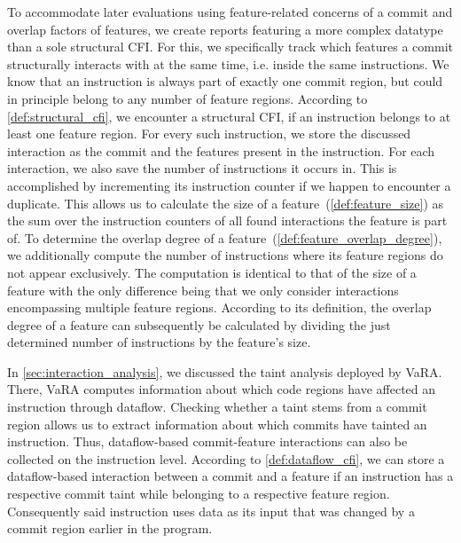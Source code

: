 To accommodate later evaluations using feature-related concerns of a commit and overlap factors of features, we create reports featuring a more complex datatype than a sole structural CFI.
For this, we specifically track which features a commit structurally interacts with at the same time, i.e. inside the same instructions.
We know that an instruction is always part of exactly one commit region, but could in principle belong to any number of feature regions.
According to \autoref{def:structural_cfi}, we encounter a structural CFI, if an instruction belongs to at least one feature region.
For every such instruction, we store the discussed interaction as the commit and the features present in the instruction.
For each interaction, we also save the number of instructions it occurs in. 
This is accomplished by incrementing its instruction counter if we happen to encounter a duplicate. 
This allows us to calculate the size of a feature~(\autoref{def:feature_size}) as the sum over the instruction counters of all found interactions the feature is part of.
To determine the overlap degree of a feature~(\autoref{def:feature_overlap_degree}), we additionally compute the number of instructions where its feature regions do not appear exclusively.
The computation is identical to that of the size of a feature with the only difference being that we only consider interactions encompassing multiple feature regions.
According to its definition, the overlap degree of a feature can subsequently be calculated by dividing the just determined number of instructions by the feature's size.

In \autoref{sec:interaction_analysis}, we discussed the taint analysis deployed by VaRA.
There, VaRA computes information about which code regions have affected an instruction through dataflow.
Checking whether a taint stems from a commit region allows us to extract information about which commits have tainted an instruction.
Thus, dataflow-based commit-feature interactions can also be collected on the instruction level.
According to \autoref{def:dataflow_cfi}, we can store a dataflow-based interaction between a commit and a feature if an instruction has a respective commit taint while belonging to a respective feature region.
Consequently said instruction uses data as its input that was changed by a commit region earlier in the program. 

\iffalse
For our research we examine numerous software projects to get a wide range of reference data, as commit-feature interactions could potentially vary greatly between different code spaces.
Accordingly, the VaRA-Tool-Suite was extended making it possible to generate a report comprising all found CFIs of an according type in a software project.
This aids us in examining several software projects to gain sufficient and sensible data about commit-feature interactions.
The created reports are also evaluated in the VaRA-Tool-Suite, which offers support to process and display statstics of the generated data. \\
\fi 
